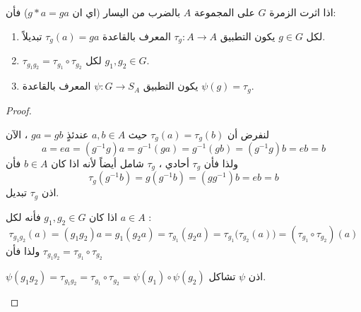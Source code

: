 \begin{theorem}\label{thm:ch3thm1}
	اذا اثرت الزمرة $G$ على المجموعة $A$ بالضرب من اليسار (اي ان
	$g*a=ga$) فأن:
	\begin{enumerate}[label=(\alph*)]
		\item لكل $g\in G$ يكون التطبيق $\tau_g : A \to A$ المعرف بالقاعدة $\tau_g(a)= ga$ تبديلاً.
		\item $\tau_{g_1g_2} = \tau_{g_1} \circ \tau_{g_2}$ لكل $g_1, g_2\in G$.
		\item يكون التطبيق $\psi : G \to S_A$ المعرف بالقاعدة $\psi(g) = \tau_g$.
	\end{enumerate}
\end{theorem}
\begin{proof}
	\begin{tasks*}
		\item لنفرض أن $\tau_g(a) = \tau_g(b)$ حيث $a, b\in A$ عندئذٍ $ga=gb$ ، الآن
		\[
		a = ea = (g^{-1} g)a = g^{-1} (ga) = g^{-1}(gb) = (g^{-1}g)b=eb=b
		\]
		ولذا فأن $\tau_g$ أحادي ، $\tau_g$ شامل أيضاً لأنه اذا كان $b\in A$ فأن
		\[
		\tau_g(g^{-1} b) = g(g^{-1}b) = (gg^{-1})b=eb=b 
		\]
		اذن $\tau_g$ تبديل.
		\item اذا كان $g_1, g_2 \in G$ فأنه لكل $a\in A$ :
		\[
		\tau_{g_1g_2}(a) = (g_1g_2) a=g_1(g_2 a) = \tau_{g_1}(g_2 a) = \tau_{g_1} \big(\tau_{g_2}(a)\big) = (\tau_{g_1} \circ \tau_{g_2})(a)
		\]
		ولذا فأن 
		$\tau_{g_1g_2} = \tau_{g_1}\circ \tau_{g_2}$
		
		\item $\psi(g_1g_2) = \tau_{g_1g_2} = \tau_{g_1}\circ \tau_{g_2} = \psi(g_1) \circ \psi(g_2)$ اذن $\psi$ تشاكل.
	\end{tasks*}
\end{proof}


